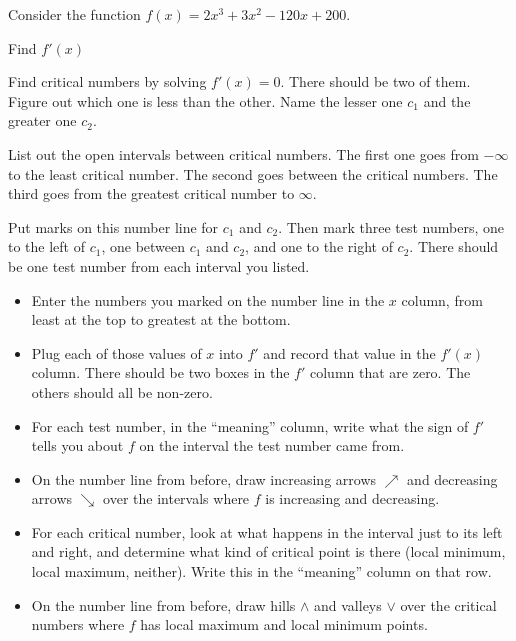 \label{sec:gr-with-fp}

Consider the function $f(x) = 2x^3 + 3x^2 - 120x + 200$.

\begin{ProblemSet}

 \begin{Problem}
  Find $f'(x)$
 \end{Problem}

 \begin{Problem}[pencil space=3in]
  Find critical numbers by solving $f'(x) = 0$.
  There should be two of them.
  Figure out which one is less than the other.
  Name the lesser one $c_1$ and the greater one $c_2$.
 \end{Problem}

 \begin{Problem}
  List out the open intervals between critical numbers.
  The first one goes from $-\infty$ to the least critical number.
  The second goes between the critical numbers.
  The third goes from the greatest critical number to $\infty$.
 \end{Problem}

 \newpage

 \begin{Problem}[pencil space=0in]
  Put marks on this number line for $c_1$ and $c_2$.
  Then mark three test numbers, one to the left of $c_1$,
  one between $c_1$ and $c_2$,
  and one to the right of $c_2$.
  There should be one test number from each interval you listed.

  \NumberLine
 \end{Problem}

 \begin{Problem}[pencil space=0in]
  \begin{itemize}
  \item Enter the numbers you marked on the number line in the $x$ column, from least at the top to greatest at the bottom.
  \item Plug each of those values of $x$ into $f'$ and record that value in the $f'(x)$ column.
   There should be two boxes in the $f'$ column that are zero.
   The others should all be non-zero.
  \item For each test number, in the ``meaning'' column, write what the sign of $f'$ tells you about $f$ on the interval the test number came from.
  \item On the number line from before, draw increasing arrows $\nearrow$ and decreasing arrows $\searrow$ over the intervals where $f$ is increasing and decreasing.
  \item For each critical number, look at what happens in the interval just to its left and right, and determine what kind of critical point is there (local minimum, local maximum, neither).
   Write this in the ``meaning'' column on that row.
  \item On the number line from before, draw hills $\wedge$ and valleys $\vee$ over the critical numbers where $f$ has local maximum and local minimum points.
  \end{itemize}
  \bigskip


\end{Problem}
\end{ProblemSet}
